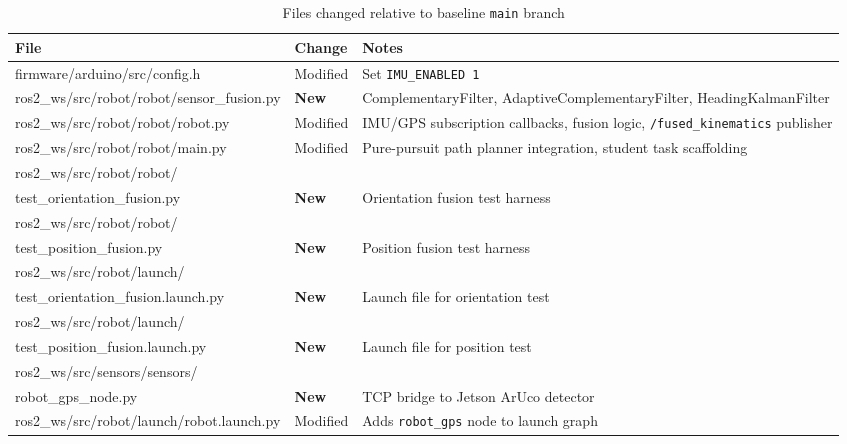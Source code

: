 \documentclass[12pt,letterpaper]{article}
\begin{document}
\begin{table}[H]
  \centering\small
  \caption{Files changed relative to baseline \texttt{main} branch}
  \label{tab:files}
  \begin{tabularx}{\textwidth}{%
    >{\ttfamily\raggedright\arraybackslash}p{}  %
    l                                                          %
    X}                                                         %
    \toprule
    \normalfont\textbf{File} & \textbf{Change} & \textbf{Notes} \\
    \midrule
    firmware/arduino/src/config.h
      & Modified & Set \texttt{IMU\_ENABLED~1} \\[2pt]
    ros2\_ws/src/robot/robot/sensor\_fusion.py
      & \textbf{New} & ComplementaryFilter, AdaptiveComplementaryFilter,
        HeadingKalmanFilter \\[2pt]
    ros2\_ws/src/robot/robot/robot.py
      & Modified & IMU/GPS subscription callbacks, fusion logic,
        \texttt{/fused\_kinematics} publisher \\[2pt]
    ros2\_ws/src/robot/robot/main.py
      & Modified & Pure-pursuit path planner integration, student task
        scaffolding \\[2pt]
    ros2\_ws/src/robot/robot/\\test\_orientation\_fusion.py
      & \textbf{New} & Orientation fusion test harness \\[2pt]
    ros2\_ws/src/robot/robot/\\test\_position\_fusion.py
      & \textbf{New} & Position fusion test harness \\[2pt]
    ros2\_ws/src/robot/launch/\\test\_orientation\_fusion.launch.py
      & \textbf{New} & Launch file for orientation test \\[2pt]
    ros2\_ws/src/robot/launch/\\test\_position\_fusion.launch.py
      & \textbf{New} & Launch file for position test \\[2pt]
    ros2\_ws/src/sensors/sensors/\\robot\_gps\_node.py
      & \textbf{New} & TCP bridge to Jetson ArUco detector \\[2pt]
    ros2\_ws/src/robot/launch/robot.launch.py
      & Modified & Adds \texttt{robot\_gps} node to launch graph \\
    \bottomrule
  \end{tabularx}
\end{table}
\end{document}

